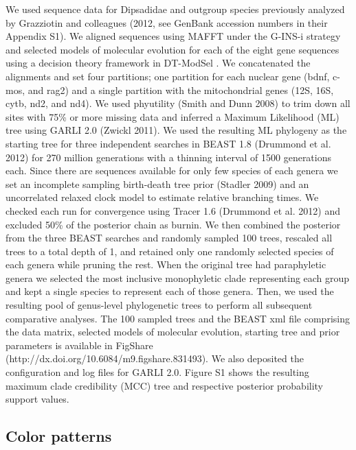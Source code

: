 We used sequence data for Dipsadidae and outgroup species previously analyzed by Grazziotin and colleagues (2012, see GenBank accession numbers in their Appendix S1). We aligned sequences using MAFFT \citep{katoh_mafft_2005} under the G-INS-i strategy and selected models of molecular evolution for each of the eight gene sequences using a decision theory framework in DT-ModSel \citep{minin_2003}. We concatenated the alignments and set four partitions; one partition for each nuclear gene (bdnf, c-mos, and rag2) and a single partition with the mitochondrial genes (12S, 16S, cytb, nd2, and nd4). We used phyutility (Smith and Dunn 2008) to trim down all sites with 75\% or more missing data and inferred a Maximum Likelihood (ML) tree using GARLI 2.0 (Zwickl 2011). We used the resulting ML phylogeny as the starting tree for three independent searches in BEAST 1.8 (Drummond et al. 2012) for 270 million generations with a thinning interval of 1500 generations each. Since there are sequences available for only few species of each genera we set an incomplete sampling birth-death tree prior (Stadler 2009) and an uncorrelated relaxed clock model to estimate relative branching times. We checked each run for convergence using Tracer 1.6 (Drummond et al. 2012) and excluded 50\% of the posterior chain as burnin. We then combined the posterior from the three BEAST searches and randomly sampled 100 trees, rescaled all trees to a total depth of 1, and retained only one randomly selected species of each genera while pruning the rest. When the original tree had paraphyletic genera we selected the most inclusive monophyletic clade representing each group and kept a single species to represent each of those genera. Then, we used the resulting pool of genus-level phylogenetic trees to perform all subsequent comparative analyses. The 100 sampled trees and the BEAST xml file comprising the data matrix, selected models of molecular evolution, starting tree and prior parameters is available in FigShare (http://dx.doi.org/10.6084/m9.figshare.831493). We also deposited the configuration and log files for GARLI 2.0. Figure S1 shows the resulting maximum clade credibility (MCC) tree and respective posterior probability support values.

\subsection{Color patterns}

